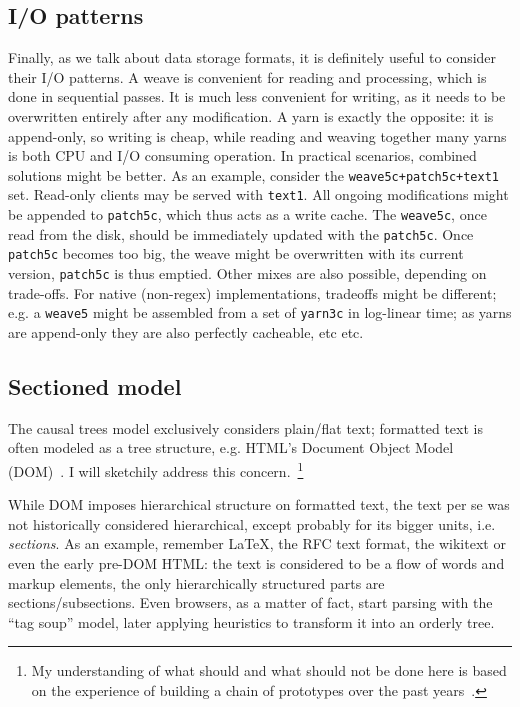 \documentclass{sig-alternate}
\begin{document}
\subsection{I/O patterns}	\label{sec:io}

Finally, as we talk about data storage formats, it is definitely useful to consider their I/O patterns.
A weave is convenient for reading and processing, which is done in sequential passes.
It is much less convenient for writing, as it needs to be overwritten entirely after any modification.
A yarn is exactly the opposite: it is append-only, so writing is cheap, while reading and weaving together many yarns is both CPU and I/O consuming operation.
In practical scenarios, combined solutions might be better.
As an example, consider the {\tt weave5c+patch5c+text1} set.
Read-only clients may be served with {\tt text1}.
All ongoing modifications might be appended to {\tt patch5c}, which thus acts as a write cache.
The {\tt weave5c}, once read from the disk, should be immediately  updated with the {\tt patch5c}.
Once {\tt patch5c} becomes too big, the weave might be overwritten with its current version, {\tt patch5c} is thus emptied.
Other mixes are also possible, depending on trade-offs.
For native (non-regex) implementations, tradeoffs might be different; e.g. a {\tt weave5} might be assembled from a set of {\tt yarn3c} in log-linear time; as yarns are append-only they are also perfectly cacheable, etc etc.

\subsection{Sectioned model}	\label{sec:sec}

The causal trees model exclusively considers plain/flat text; formatted text is often modeled as a tree structure, e.g. HTML's Document Object Model (DOM)~\cite{dom}.
I will sketchily address this concern.~\footnote{My understanding of what should and what should not be done here is based on the experience of building a chain of prototypes over the past years~\cite{www06,csr07,wikisym08}.} 

While DOM imposes hierarchical structure on formatted text, the text per se was not historically considered hierarchical, except probably for its bigger units, i.e. \emph{sections}. 
As an example, remember LaTeX, the RFC text format, the wikitext or even the early pre-DOM HTML: the text is considered to be a flow of words and markup elements, the only hierarchically structured parts are sections/subsections.
Even browsers, as a matter of fact, start parsing with the ``tag soup'' model, later applying heuristics to transform it into an orderly tree. 
\end{document}
